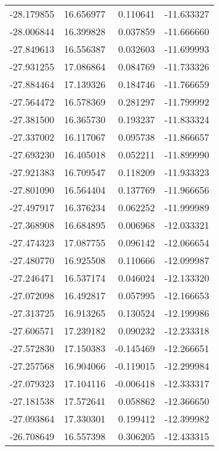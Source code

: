 \begin{tabular}{rrrr}
      -28.179855 &        16.656977 &    0.110641 & -11.633327 \\
      -28.006844 &        16.399828 &    0.037859 & -11.666660 \\
      -27.849613 &        16.556387 &    0.032603 & -11.699993 \\
      -27.931255 &        17.086864 &    0.084769 & -11.733326 \\
      -27.884464 &        17.139326 &    0.184746 & -11.766659 \\
      -27.564472 &        16.578369 &    0.281297 & -11.799992 \\
      -27.381500 &        16.365730 &    0.193237 & -11.833324 \\
      -27.337002 &        16.117067 &    0.095738 & -11.866657 \\
      -27.693230 &        16.405018 &    0.052211 & -11.899990 \\
      -27.921383 &        16.709547 &    0.118209 & -11.933323 \\
      -27.801090 &        16.564404 &    0.137769 & -11.966656 \\
      -27.497917 &        16.376234 &    0.062252 & -11.999989 \\
      -27.368908 &        16.684895 &    0.006968 & -12.033321 \\
      -27.474323 &        17.087755 &    0.096142 & -12.066654 \\
      -27.480770 &        16.925508 &    0.110666 & -12.099987 \\
      -27.246471 &        16.537174 &    0.046024 & -12.133320 \\
      -27.072098 &        16.492817 &    0.057995 & -12.166653 \\
      -27.313725 &        16.913265 &    0.130524 & -12.199986 \\
      -27.606571 &        17.239182 &    0.090232 & -12.233318 \\
      -27.572830 &        17.150383 &   -0.145469 & -12.266651 \\
      -27.257568 &        16.904066 &   -0.119015 & -12.299984 \\
      -27.079323 &        17.104116 &   -0.006418 & -12.333317 \\
      -27.181538 &        17.572641 &    0.058862 & -12.366650 \\
      -27.093864 &        17.330301 &    0.199412 & -12.399982 \\
      -26.708649 &        16.557398 &    0.306205 & -12.433315 \\

\end{tabular}
